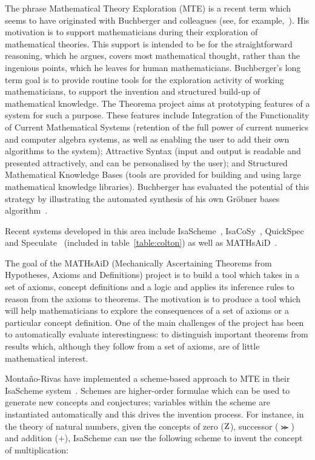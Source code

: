 The phrase Mathematical Theory Exploration (MTE) is a recent term %
which seems to have originated with Buchberger and colleagues (see, %
for example,~\cite{buchberger}). His motivation is to support
mathematicians during their exploration of mathematical theories. This
support is intended to be for the straightforward reasoning, which he
argues, covers most mathematical thought, rather than the ingenious
points, which he leaves for human mathematicians. Buchberger's long
term goal is to provide routine tools for the exploration activity of
working mathematicians, to support the invention and structured
build-up of mathematical knowledge. The Theorema project aims at
prototyping features of a system for such a purpose. These features
include Integration of the Functionality of Current Mathematical
Systems (retention of the full power of current numerics and computer
algebra systems, as well as enabling the user to add their own
algorithms to the system); Attractive Syntax (input and output is
readable and presented attractively, and can be personalised by the
user); and Structured Mathematical Knowledge Bases (tools are provided
for building and using large mathematical knowledge
libraries). Buchberger has evaluated the potential of this strategy by
illustrating the automated synthesis of his own Gr\"obner bases
algorithm~\cite{buchberger:04}.

Recent systems developed in this area include IsaScheme~\cite{MontanoRivas2011},
IsaCoSy~\cite{Johansson.Dixon.Bundy:conjecture-generation},
QuickSpec~\cite{QuickSpec} and Speculate~\cite{braquehais2017speculate}
(included in table~\ref{table:colton}) as well as MATHsAiD~\cite{roy}.

The goal of the MATHsAiD (Mechanically Ascertaining Theorems from Hypotheses,
Axioms and Definitions) project is to build a tool which takes in a set of
axioms, concept definitions and a logic and applies its inference rules to
reason from the axioms to theorems. The motivation is to produce a tool which
will help mathematicians to explore the consequences of a set of axioms or a
particular concept definition. One of the main challenges of the project has
been to automatically evaluate interestingness: to distinguish important
theorems from results which, although they follow from a set of axioms, are of
little mathematical interest.

Monta{\~n}o-Rivas \etal{} have implemented a scheme-based approach to MTE in their
IsaScheme system~\cite{MontanoRivas2011}. Schemes are higher-order formulae
which can be used to generate new concepts and conjectures; variables within the
scheme are instantiated automatically and this drives the invention process.
For instance, in the theory of natural numbers, given the concepts of zero
($\text{Z}$), successor ($\Succ$) and addition ($\plus$), IsaScheme can use the
following scheme to invent the concept of multiplication:


